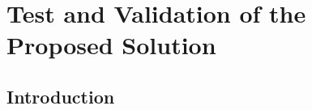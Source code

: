 \chapter{Test and Validation of the Proposed Solution }

\renewcommand{\chaptername}{Chapter}

\section*{Introduction}
%

